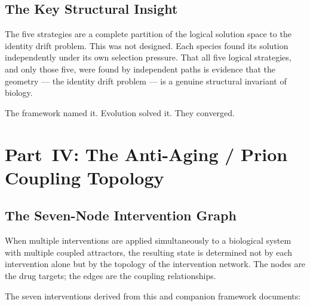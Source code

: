 \documentclass[12pt,a4paper]{article}
\begin{document}
\subsection{The Key Structural Insight}

The five strategies are a complete partition of the logical solution space
to the identity drift problem. This was not designed. Each species found its
solution independently under its own selection pressure. That all five logical
strategies, and only those five, were found by independent paths is evidence
that the geometry --- the identity drift problem --- is a genuine structural
invariant of biology.

The framework named it. Evolution solved it. They converged.

\section{Part~IV: The Anti-Aging / Prion Coupling Topology}

\subsection{The Seven-Node Intervention Graph}

When multiple interventions are applied simultaneously to a biological system
with multiple coupled attractors, the resulting state is determined not by
each intervention alone but by the topology of the intervention network. The
nodes are the drug targets; the edges are the coupling relationships.

The seven interventions derived from this and companion framework documents:
\end{document}
